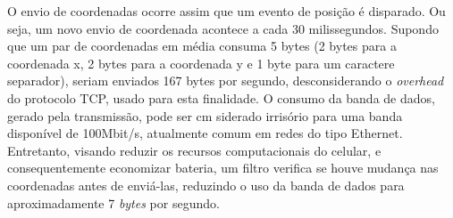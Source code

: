 O envio de coordenadas ocorre assim que um evento de posição é disparado. Ou seja, um novo envio de coordenada acontece a cada 30 milissegundos. Supondo que um par de coordenadas em média consuma 5 bytes (2 bytes para a coordenada x, 2 bytes para a coordenada y e 1 byte para um caractere separador), seriam enviados 167 bytes por segundo, desconsiderando o \textit{overhead} do protocolo TCP, usado para esta finalidade. O consumo da banda de dados, gerado pela transmissão, pode ser cm siderado irrisório para uma banda disponível de 100Mbit/s, atualmente comum em redes do tipo Ethernet. Entretanto, visando reduzir os recursos computacionais do celular, e consequentemente economizar bateria, um filtro verifica se houve mudança nas coordenadas antes de enviá-las, reduzindo o uso da banda de dados para aproximadamente 7 \textit{bytes} por segundo.\par

  